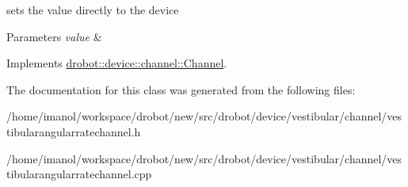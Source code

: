 sets the value directly to the device 


\begin{DoxyParams}{Parameters}
{\em value} & \\
\hline
\end{DoxyParams}


Implements \hyperlink{classdrobot_1_1device_1_1channel_1_1Channel_a612a3f6afe59e238583d6d40d9ddcaf8}{drobot\-::device\-::channel\-::\-Channel}.



The documentation for this class was generated from the following files\-:\begin{DoxyCompactItemize}
\item 
/home/imanol/workspace/drobot/new/src/drobot/device/vestibular/channel/vestibularangularratechannel.\-h\item 
/home/imanol/workspace/drobot/new/src/drobot/device/vestibular/channel/vestibularangularratechannel.\-cpp\end{DoxyCompactItemize}
